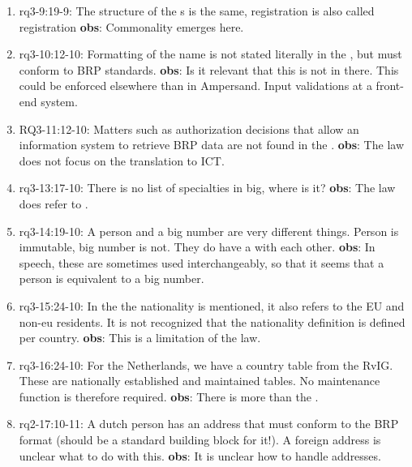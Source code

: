 \begin{enumerate}
    \item rq3-9:19-9: The structure of the s is the same, registration is also called registration
    \newline\textbf{obs}: Commonality emerges here.
    
    \item rq3-10:12-10: Formatting of the name is not stated literally in the , but must conform to BRP standards.
    \newline\textbf{obs}: Is it relevant that this is not in there.
    This could be enforced elsewhere than in Ampersand.
    Input validations at a front-end system.
     
    \item RQ3-11:12-10: Matters such as authorization decisions that allow an information system to retrieve BRP data are not found in the .
    \newline\textbf{obs}: The law does not focus on the translation to ICT.
     
     
    \item rq3-13:17-10: There is no list of specialties in \acrshort{big}, where is it?
    \newline\textbf{obs}: The law does refer to .
     
    \item rq3-14:19-10: A  person and a big number are very different things.
    Person is immutable, big number is not.
    They do have a  with each other.
    \newline\textbf{obs}: In speech, these are sometimes used interchangeably, so that it seems that a person is equivalent to a big number.
     
    \item rq3-15:24-10: In the  the nationality is mentioned, it also refers to the EU and non-eu residents.
    It is not recognized that the nationality definition is defined per country.
    \newline\textbf{obs}: This is a limitation of the law.
     
    \item rq3-16:24-10: For the Netherlands, we have a country table from the RvIG.
    These are nationally established and maintained tables.
    No maintenance function is therefore required.
    \newline\textbf{obs}: There is more than the .
     
    \item rq2-17:10-11: A dutch person has an  address that must conform to the BRP format (should be a standard building block for it!).
    A foreign address is unclear what to do with this.
    \newline\textbf{obs}: It is unclear how to handle addresses.
\end{enumerate}

